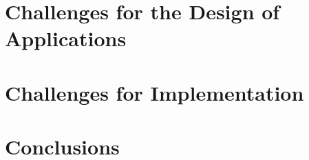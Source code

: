 \documentclass{article}
\begin{document}
\section{Challenges for the Design of Applications}

\section{Challenges for Implementation}

\section{Conclusions}


\end{document}
